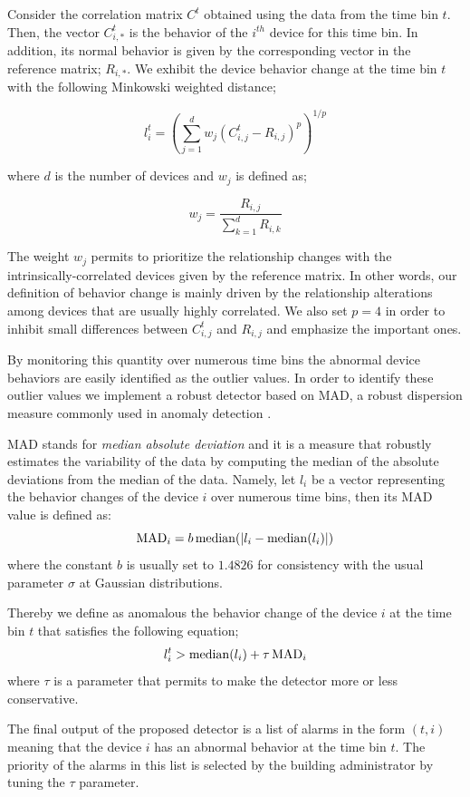 Consider the correlation matrix $C^t$ obtained using the data from the time bin $t$.
Then, the vector $C^t_{i,*}$ is the behavior of the $i^{th}$ device for this time bin.
In addition, its normal behavior is given by the corresponding vector in the reference matrix; $R_{i,*}$.
We exhibit the device behavior change at the time bin $t$ with the following Minkowski weighted distance;

\[ l^t_{i} = \left(\sum_{j=1}^d  w_j\left(C^t_{i,j} - R_{i,j}\right)^p\right)^{1/p} \]

where $d$ is the number of devices and $w_j$ is defined as;

\[ w_j = \frac{R_{i,j}}{\sum_{k=1}^d R_{i,k}} \]

The weight $w_j$ permits to prioritize the relationship changes with the intrinsically-correlated devices given by the reference matrix.
In other words, our definition of behavior change is mainly driven by the relationship alterations among devices that are usually highly correlated.
We also set $p=4$ in order to inhibit small differences between $C^t_{i,j}$ and $R_{i,j}$ and emphasize the important ones.

By monitoring this quantity over numerous time bins the abnormal device behaviors are easily identified as the outlier values.
In order to identify these outlier values we implement a robust detector based on MAD, a robust dispersion measure commonly used in anomaly detection \cite{huber:wiley2009,chan:springer2005}.

MAD stands for \emph{median absolute deviation} and it is a measure that robustly estimates the variability of the data by computing the median of the absolute deviations from the median of the data.
Namely, let $l_{i}$ be a vector representing the behavior changes of the device $i$ over numerous time bins, then its MAD value is defined as:
\[ \operatorname{MAD}_i = b \operatorname{median}(\lvert l_{i} - \operatorname{median}(l_{i})\rvert)\]
where the constant $b$ is usually set to $1.4826$ for consistency with the usual parameter $\sigma$ at Gaussian distributions.

Thereby we define as anomalous the behavior change of the device $i$ at the time bin $t$ that satisfies the following equation;
\[l^t_{i} > \operatorname{median}(l_{i}) + \tau  \operatorname{MAD}_i\]
where $\tau$ is a parameter that permits to make the detector more or less conservative.

The final output of the proposed detector is a list of alarms in the form $(t,i)$ meaning that the device $i$ has an abnormal behavior at the time bin $t$.
The priority of the alarms in this list is selected by the building administrator by tuning the $\tau$ parameter.
